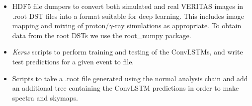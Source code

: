 \begin{itemize}
    \item HDF5 file dumpers to convert both simulated and real VERITAS images in .root DST files into a format suitable for deep learning. This includes image mapping and mixing of proton/$\gamma$-ray simulations as appropriate. To obtain data from the root DSTs we use the root\_numpy \cite{rootnumpy} package.
    \item \textit{Keras} scripts to perform training and testing of the ConvLSTMs, and write test predictions for a given event to file.
    \item Scripts to take a .root file generated using the normal analysis chain and add an additional tree containing the ConvLSTM predictions in order to make spectra and skymaps.
\end{itemize}

